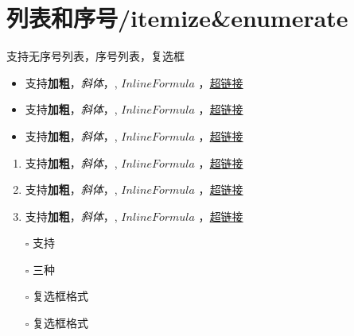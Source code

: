 \documentclass{article}%
\begin{document}
%
%
%

%
\section{列表和序号/itemize\&enumerate}%

%

%
支持无序号列表，序号列表，复选框%

%

%
\begin{itemize}%
\item%
支持\textbf{加粗}，\textit{斜体}，, $Inline Formula$ ，\href{http:///www.github.com}{超链接}%
\item%
支持\textbf{加粗}，\textit{斜体}，, $Inline Formula$ ，\href{http:///www.github.com}{超链接}%
\item%
支持\textbf{加粗}，\textit{斜体}，, $Inline Formula$ ，\href{http:///www.github.com}{超链接}%
\end{itemize}%

%
%

%

%
\begin{enumerate}%
\item%
支持\textbf{加粗}，\textit{斜体}，, $Inline Formula$ ，\href{http:///www.github.com}{超链接}%
\item%
支持\textbf{加粗}，\textit{斜体}，, $Inline Formula$ ，\href{http:///www.github.com}{超链接}%
\item%
支持\textbf{加粗}，\textit{斜体}，, $Inline Formula$ ，\href{http:///www.github.com}{超链接}%
\end{enumerate}%

%
%

%

%
\begin{itemize}%
\item[\rlap{\raisebox{0.3ex}{\hspace{0.4ex}\scriptsize \ding{56}}}$\square$]%
支持%
\item[$\square$]%
三种%
\item[\rlap{\raisebox{0.3ex}{\hspace{0.4ex}\tiny \ding{52}}}$\square$]%
复选框格式%
\item[$\square$]%
复选框格式%
\end{itemize}%

%
%
%
\end{document}
